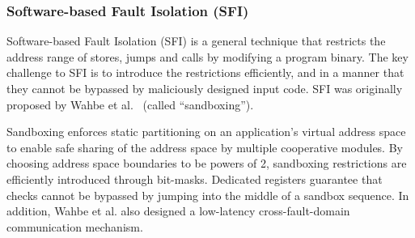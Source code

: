 \subsubsection{Software-based Fault Isolation (SFI)}
\label{subsec:sfi}
%
Software-based Fault Isolation (SFI) is a general technique that
restricts the address range of stores, jumps and calls by modifying a
program binary.
%
The key challenge to SFI is to introduce the restrictions efficiently, and in
a manner that they cannot be bypassed by maliciously designed input
code.
%
SFI was originally proposed by Wahbe et al.~\cite{wahbe93sfi} (called
``sandboxing'').
%
%
%

Sandboxing enforces static partitioning on an application's virtual address
space to enable safe sharing of the address space by multiple
cooperative modules.
%
By choosing address space boundaries to be powers of 2, sandboxing
restrictions are efficiently introduced through bit-masks.
%
%
Dedicated registers guarantee that checks cannot be bypassed by
jumping into the middle of a sandbox sequence.
%
In addition, Wahbe et al. also designed a low-latency
cross-fault-domain communication mechanism.
%

